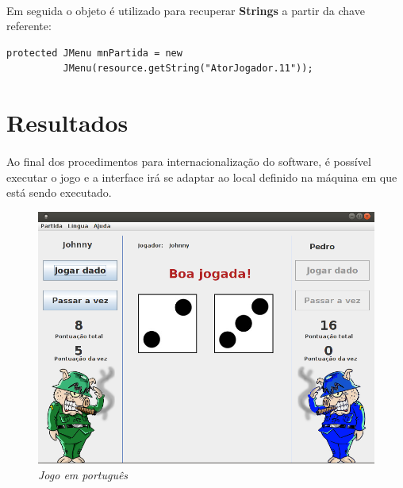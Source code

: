 \documentclass[a4paper, 12pt]{article}
\begin{document}
\paragraph{} Em seguida o objeto é utilizado para recuperar {\bf
  Strings} a partir da chave referente:

\begin{lstlisting}[frame=single, caption={Uso ResourceBundle},
  captionpos=b]
protected JMenu mnPartida = new
          JMenu(resource.getString("AtorJogador.11"));
\end{lstlisting}

\section{Resultados} \label{results}

\FloatBarrier
\paragraph{} Ao final dos procedimentos para internacionalização do
software, é possível executar o jogo e a interface irá se adaptar ao
local definido na máquina em que está sendo executado.

\begin{figure}[h!]
\centering
\includegraphics[width=\textwidth]{Screenshot-portugues.png}
\caption{\emph{Jogo em português}}
\end{figure}
\end{document}
